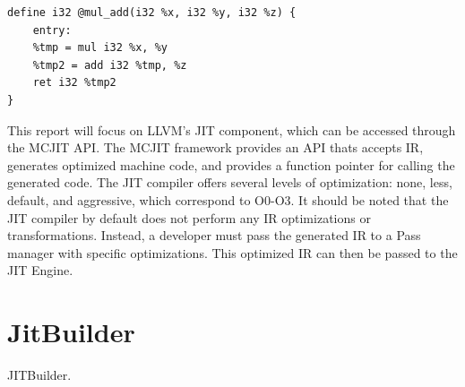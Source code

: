 \begin{lstlisting}[float,floatplacement=H,
caption={LLVM IR for a function multiplying x * y and adding z \cite{LLVM_Jit_Tutorial}},
label=lst:llvm_ir]
define i32 @mul_add(i32 %x, i32 %y, i32 %z) {
    entry:
    %tmp = mul i32 %x, %y
    %tmp2 = add i32 %tmp, %z
    ret i32 %tmp2
}\end{lstlisting}

This report will focus on LLVM's JIT component, which can be accessed through the MCJIT API.
The MCJIT framework provides an API thats accepts IR, generates optimized machine code, and provides a function pointer for calling the generated code.
The JIT compiler offers several levels of optimization: none, less, default, and aggressive, which correspond to O0-O3.
It should be noted that the JIT compiler by default does not perform any IR optimizations or transformations.
Instead, a developer must pass the generated IR to a Pass manager with specific optimizations.
This optimized IR can then be passed to the JIT Engine.

\section{JitBuilder}
\label{sec:jitbuilder}
JITBuilder.